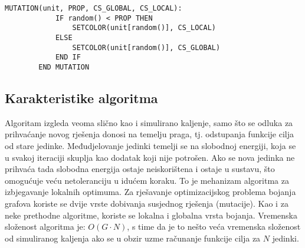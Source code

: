 \documentclass[times, utf8, diplomski, numeric]{fer}
\begin{document}
\begin{singlespace}
	\begin{lstlisting}[caption=Pseudok\^{o}d mutacije genetskog kaljenja]
		MUTATION(unit, PROP, CS_GLOBAL, CS_LOCAL):
			IF random() < PROP THEN
				SETCOLOR(unit[random()], CS_LOCAL)				
			ELSE
				SETCOLOR(unit[random()], CS_GLOBAL)
			END IF
		END MUTATION
	\end{lstlisting}
\end{singlespace}


\subsection{Karakteristike algoritma}

Algoritam izgleda veoma slično kao i simulirano kaljenje, samo što se odluka za prihvaćanje novog rješenja donosi na temelju praga, tj. odstupanja funkcije cilja od stare jedinke. Međudjelovanje jedinki temelji se na slobodnoj energiji, koja se u svakoj iteraciji skuplja kao dodatak koji nije potrošen. Ako se nova jedinka ne prihvaća tada slobodna energija ostaje neiskorištena i ostaje u sustavu, što omogućuje veću netoleranciju u idućem koraku. To je mehanizam algoritma za izbjegavanje lokalnih optimuma.
Za rješavanje optimizacijskog problema bojanja grafova koriste se dvije vrste dobivanja susjednog rješenja (mutacije). Kao i za neke prethodne algoritme, koriste se lokalna i globalna vrsta bojanja.  
Vremenska složenost algoritma je: $O(G \cdot N)$, s time da je to nešto veća vremenska složenost od simuliranog kaljenja ako se u obzir uzme računanje funkcije cilja za $N$ jedinki.
\end{document}
